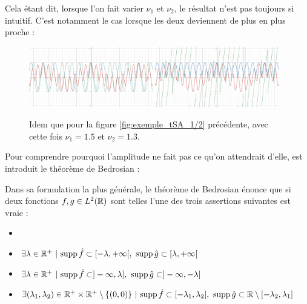 \begin{annexe}
Cela étant dit, lorsque l'on fait varier $\nu_1$ et $\nu_2$, le résultat n'est pas toujours si intuitif. C'est notamment le cas lorsque les deux deviennent de plus en plus proche :

\begin{figure}[h]\centering
	\includegraphics[width=0.48\textwidth]{fig/part-1/ex SA - 21.png}\hfill
	\includegraphics[width=0.48\textwidth]{fig/part-1/ex SA - 22.png}
	\caption{Idem que pour la figure \ref{fig:exemple_tSA_1/2} précédente, avec cette fois $\nu_1=1.5$ et $\nu_2=1.3$.}
	\label{fig:exemple_tSA_2/2}
\end{figure}

Pour comprendre pourquoi l'amplitude ne fait pas ce qu'on attendrait d'elle, est introduit le théorème de Bedrosian :

\begin{theoreme}[de Bedrosian]\label{theo:2Bedrosian}
	Dans sa formulation la plus générale, le théorème de Bedrosian énonce que si deux fonctions $f,g\in L^2(\mathbb{R})$ sont telles l'une des trois assertions suivantes est vraie :
	\begin{itemize}%
		\item 
		\item $\exists \lambda\in\mathbb{R}^+\ |\ \text{\normalfont supp}\, \hat{f} \subset [-\lambda, +\infty[,\ \text{\normalfont supp}\, \hat{g} \subset [\lambda, +\infty[$\label{item:1condi_theo2Bedrosian}
		
		\item $\exists \lambda\in\mathbb{R}^+\ |\ \text{\normalfont supp}\, \hat{f} \subset ]-\infty, \lambda],\ \text{\normalfont supp}\, \hat{g} \subset ]-\infty,-\lambda]$ \label{item:2condi_theo2Bedrosian}
		
		\item $\exists (\lambda_1,\lambda_2)\in \mathbb{R}^+\times\mathbb{R}^+ \setminus\{(0,0)\}\ |\ \text{\normalfont supp}\, \hat{f} \subset [-\lambda_1, \lambda_2],\ \text{\normalfont supp}\, \hat{g} \subset \mathbb{R}\setminus[-\lambda_2,\lambda_1]$
		

\end{itemize}
\end{theoreme}
\end{annexe}
